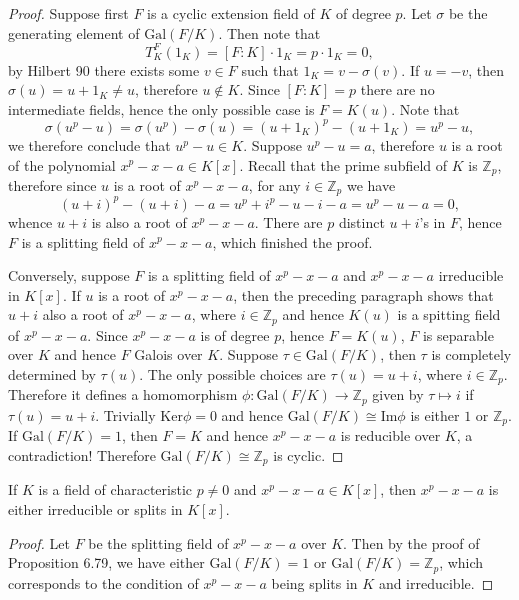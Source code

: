 \begin{proof}
Suppose first $F$ is a cyclic extension field of $K$ of degree $p$. Let $\sigma$ be the generating element of $\mathrm{Gal}(F/K)$. Then note that 
$$
T_{K}^{F}\left( 1_K \right) =\left[ F:K \right] \cdot 1_K=p\cdot 1_K=0,
$$
by Hilbert 90 there exists some $v\in F$ such that $1_K=v-\sigma(v)$. If $u=-v$, then $\sigma(u)=u+1_K\ne u$, therefore $u\notin K$. Since $[F:K]=p$ there are no intermediate fields, hence the only possible case is $F=K(u)$. Note that 
$$
\sigma \left( u^p-u \right) =\sigma \left( u^p \right) -\sigma \left( u \right) =\left( u+1_K \right) ^p-\left( u+1_K \right) =u^p-u,
$$
we therefore conclude that $u^p-u\in K$. Suppose $u^p-u=a$, therefore $u$ is a root of the polynomial $x^p-x-a\in K[x]$. Recall that the prime subfield of $K$ is $\mathbb{Z}_p$, therefore since $u$ is a root of $x^p-x-a$, for any $i\in\mathbb{Z}_p$ we have 
$$
\left( u+i \right) ^p-\left( u+i \right) -a=u^p+i^p-u-i-a=u^p-u-a=0,
$$
whence $u+i$ is also a root of $x^p-x-a$. There are $p$ distinct $u+i$'s in $F$, hence $F$ is a splitting field of $x^p-x-a$, which finished the proof.\par
Conversely, suppose $F$ is a splitting field of $x^p-x-a$ and $x^p-x-a$ irreducible in $K[x]$. If $u$ is a root of $x^p-x-a$, then the preceding paragraph shows that $u+i$ also a root of $x^p-x-a$, where $i\in\mathbb{Z}_p$ and hence $K(u)$ is a spitting field of $x^p-x-a$. Since $x^p-x-a$ is of degree $p$, hence $F=K(u)$, $F$ is separable over $K$ and hence $F$ Galois over $K$. Suppose $\tau\in\mathrm{Gal}(F/K)$, then $\tau$ is completely determined by $\tau(u)$. The only possible choices are $\tau(u)=u+i$, where $i\in\mathbb{Z}_p$. Therefore it defines a homomorphism $\phi:\mathrm{Gal}(F/K)\to\mathbb{Z}_p$ given by $\tau\mapsto i$ if $\tau(u)=u+i$. Trivially $\mathrm{Ker}\phi=0$ and hence $\mathrm{Gal}(F/K)\cong\mathrm{Im}\phi$ is either $1$ or $\mathbb{Z}_p$. If $\mathrm{Gal}(F/K)=1$, then $F=K$ and hence $x^p-x-a$ is reducible over $K$, a contradiction! Therefore $\mathrm{Gal}(F/K)\cong\mathbb{Z}_p$ is cyclic.
\end{proof}
\begin{corollary}
If $K$ is a field of characteristic $p\ne 0$ and $x^p-x-a\in K[x]$, then $x^p-x-a$ is either irreducible or splits in $K[x]$.
\end{corollary}
\begin{proof}
Let $F$ be the splitting field of $x^p-x-a$ over $K$. Then by the proof of Proposition 6.79, we have either $\mathrm{Gal}(F/K)=1$ or $\mathrm{Gal}(F/K)=\mathbb{Z}_p$, which corresponds to the condition of $x^p-x-a$ being splits in $K$ and irreducible.
\end{proof}
